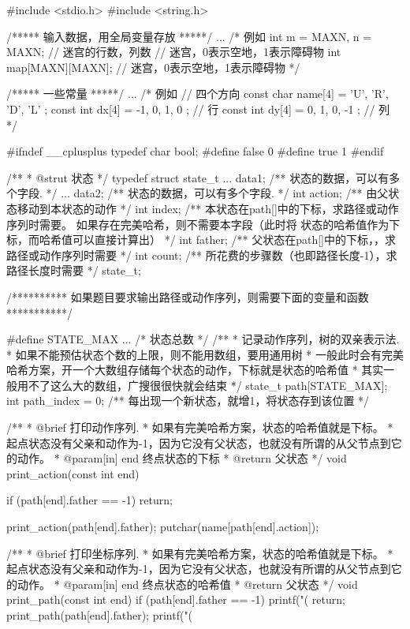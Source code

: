 \begin{Codex}[label=bfs_template.c]
#include <stdio.h>
#include <string.h>

/***** 输入数据，用全局变量存放 *****/
...
/*
例如
int m = MAXN, n = MAXN;  // 迷宫的行数，列数
// 迷宫，0表示空地，1表示障碍物
int map[MAXN][MAXN];  // 迷宫，0表示空地，1表示障碍物
 */

/***** 一些常量 *****/
...
/* 例如
// 四个方向
const char name[4] = { 'U', 'R', 'D', 'L' };
const int dx[4] = { -1, 0, 1, 0 }; // 行
const int dy[4] = { 0, 1, 0, -1 }; // 列
*/

#ifndef __cplusplus
typedef char bool;
#define false 0
#define true 1
#endif

/**
 * @strut 状态
 */
typedef struct state_t {
    ... data1;  /** 状态的数据，可以有多个字段. */
    ... data2;  /** 状态的数据，可以有多个字段. */
    int action; /** 由父状态移动到本状态的动作 */
    int index;  /** 本状态在path[]中的下标，求路径或动作序列时需要。
                    如果存在完美哈希，则不需要本字段（此时将
                   状态的哈希值作为下标，而哈希值可以直接计算出） */
    int father; /** 父状态在path[]中的下标，，求路径或动作序列时需要 */
    int count;  /** 所花费的步骤数（也即路径长度-1），求路径长度时需要 */
} state_t;

/********** 如果题目要求输出路径或动作序列，则需要下面的变量和函数 ***********/

#define STATE_MAX ...  /* 状态总数 */
/**
 * 记录动作序列，树的双亲表示法.
 * 如果不能预估状态个数的上限，则不能用数组，要用通用树
 * 一般此时会有完美哈希方案，开一个大数组存储每个状态的动作，下标就是状态的哈希值
 * 其实一般用不了这么大的数组，广搜很很快就会结束
 */
state_t path[STATE_MAX];
int path_index = 0;  /** 每出现一个新状态，就增1，将状态存到该位置 */

/**
 * @brief 打印动作序列.
 * 如果有完美哈希方案，状态的哈希值就是下标。
 * 起点状态没有父亲和动作为-1，因为它没有父状态，也就没有所谓的从父节点到它的动作。
 * @param[in] end 终点状态的下标
 * @return 父状态
 */
void print_action(const int end) {
    if (path[end].father == -1) return;

    print_action(path[end].father);
    putchar(name[path[end].action]);
}

/**
 * @brief 打印坐标序列.
 * 如果有完美哈希方案，状态的哈希值就是下标。
 * 起点状态没有父亲和动作为-1，因为它没有父状态，也就没有所谓的从父节点到它的动作。
 * @param[in] end 终点状态的哈希值
 * @return 父状态
 */
void print_path(const int end) {
    if (path[end].father == -1) {
        printf("(%
        return;
    }
    print_path(path[end].father);
    printf("(%
}


\end{Codex}
